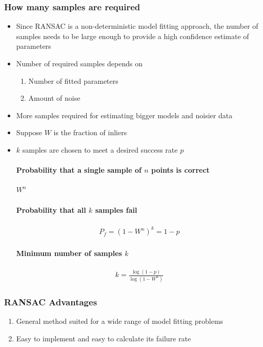 \documentclass[letterpaper,12pt]{article}
\begin{document}
\subsubsection{How many samples are required}
\begin{itemize}
 \item Since RANSAC is a non-deterministic model fitting approach, the number of samples needs to be large enough to provide a high confidence estimate of parameters
 \item Number of required samples depends on
       \begin{enumerate}
        \item Number of fitted parameters
        \item Amount of noise
       \end{enumerate}
 \item More samples required for estimating bigger models and noisier data
 \item Suppose $W$ is the fraction of inliers
 \item $k$ samples are chosen to meet a desired success rate $p$
       \paragraph{Probability that a single sample of $n$ points is correct} $W^n$
       \paragraph{Probability that all $k$ samples fail}
       \begin{align}
        P_f = (1-W^n)^k = 1-p
       \end{align}
       \paragraph{Minimum number of samples $k$}
       \begin{align}
        k = \frac{\log(1-p)}{\log(1-W^n)}
       \end{align}
\end{itemize}

\subsubsection{RANSAC Advantages}
\begin{enumerate}
 \item General method suited for a wide range of model fitting problems
 \item Easy to implement and easy to calculate its failure rate
\end{enumerate}
\end{document}
